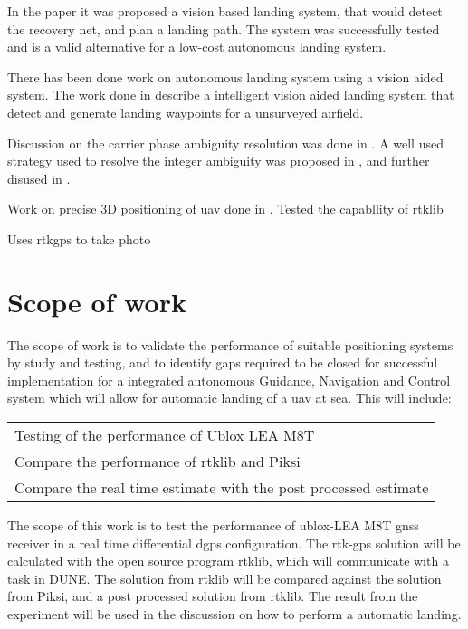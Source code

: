In the paper \citep{kim2013fully} it was proposed a vision based landing system, that would detect the recovery net, and plan a landing path. The system was successfully tested and is a valid alternative for a low-cost autonomous landing system.

There has been done work on autonomous landing system using a vision aided system. The work done in \citep{williams2012intelligent} describe a intelligent vision aided landing system that detect and generate landing waypoints for a unsurveyed airfield.

Discussion on the carrier phase ambiguity resolution was done in \citep{GeodeticBaselines}.  A well used strategy used to resolve the integer ambiguity was proposed in \citep{Ambiguity:Estimation}, and further disused in \citep{LAMBDA:METHOD,LAMBDAMETHOD}. 

Work on precise 3D positioning of \gls{uav} done in \citep{3D-RTK}. Tested the capabllity of rtklib

Uses rtkgps to take photo
\citep{Low-costRTK}  



\section{Scope of work}
The scope of work is to validate the performance of suitable positioning systems by study and testing, and to identify gaps required to be closed for successful implementation for a integrated autonomous Guidance, Navigation and Control system which will allow for automatic landing of a \gls{uav} at sea. This will include:
\begin{table}[!h]
\begin{center}
    \begin{tabular}{ l}
     Testing of the performance of Ublox LEA M8T  \\ 
     Compare the performance of \gls{rtklib} and Piksi \\
     Compare the real time estimate with the post processed estimate 
    \end{tabular}
\end{center}
\label{Tb:Evasion}
\end{table}
The scope of this work is to test the performance of ublox-LEA M8T \gls{gnss} receiver in a real time differential \gls{dgps} configuration. The \gls{rtk-gps} solution will be calculated with the open source program rtklib, which will communicate with a task in DUNE. The solution from rtklib will be compared against the solution from Piksi, and a post processed solution from rtklib. The result from the experiment will be used in the discussion on how to perform a automatic landing.

